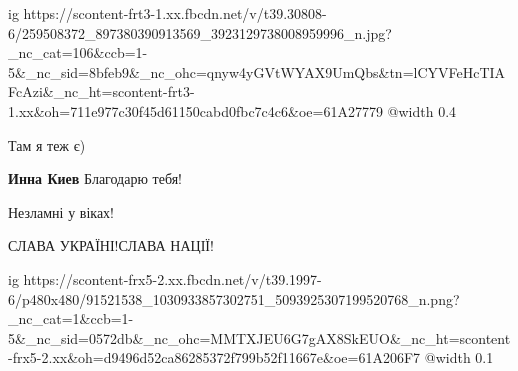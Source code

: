  
 
 
 
 

\ifcmt
  ig https://scontent-frt3-1.xx.fbcdn.net/v/t39.30808-6/259508372_897380390913569_3923129738008959996_n.jpg?_nc_cat=106&ccb=1-5&_nc_sid=8bfeb9&_nc_ohc=qnyw4yGVtWYAX9UmQbs&tn=lCYVFeHcTIAFcAzi&_nc_ht=scontent-frt3-1.xx&oh=711e977c30f45d61150cabd0fbc7c4c6&oe=61A27779
  @width 0.4
\fi

Там я теж є)

\textbf{Инна Киев} Благодарю тебя!

Незламні у віках!

СЛАВА УКРАЇНІ!СЛАВА НАЦІЇ!

\ifcmt
  ig https://scontent-frx5-2.xx.fbcdn.net/v/t39.1997-6/p480x480/91521538_1030933857302751_5093925307199520768_n.png?_nc_cat=1&ccb=1-5&_nc_sid=0572db&_nc_ohc=MMTXJEU6G7gAX8SkEUO&_nc_ht=scontent-frx5-2.xx&oh=d9496d52ca86285372f799b52f11667e&oe=61A206F7
  @width 0.1
\fi
